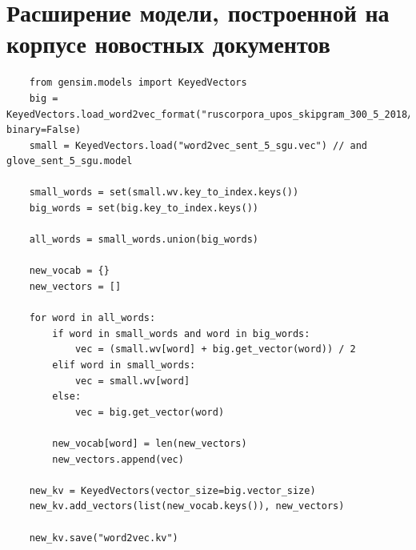 \documentclass[coursework]{SCWorks}
\begin{document}
\section{Расширение модели, построенной на корпусе новостных документов}
\label{apx:thesaurus-expanding}
\begin{verbatim}
    from gensim.models import KeyedVectors
    big = KeyedVectors.load_word2vec_format("ruscorpora_upos_skipgram_300_5_2018/model.vec", binary=False)
    small = KeyedVectors.load("word2vec_sent_5_sgu.vec") // and glove_sent_5_sgu.model
    
    small_words = set(small.wv.key_to_index.keys())
    big_words = set(big.key_to_index.keys())
    
    all_words = small_words.union(big_words)
    
    new_vocab = {}
    new_vectors = []
    
    for word in all_words:
        if word in small_words and word in big_words:
            vec = (small.wv[word] + big.get_vector(word)) / 2
        elif word in small_words:
            vec = small.wv[word]
        else:
            vec = big.get_vector(word)
    
        new_vocab[word] = len(new_vectors)
        new_vectors.append(vec)
    
    new_kv = KeyedVectors(vector_size=big.vector_size)
    new_kv.add_vectors(list(new_vocab.keys()), new_vectors)
    
    new_kv.save("word2vec.kv")
\end{verbatim}
\end{document}
